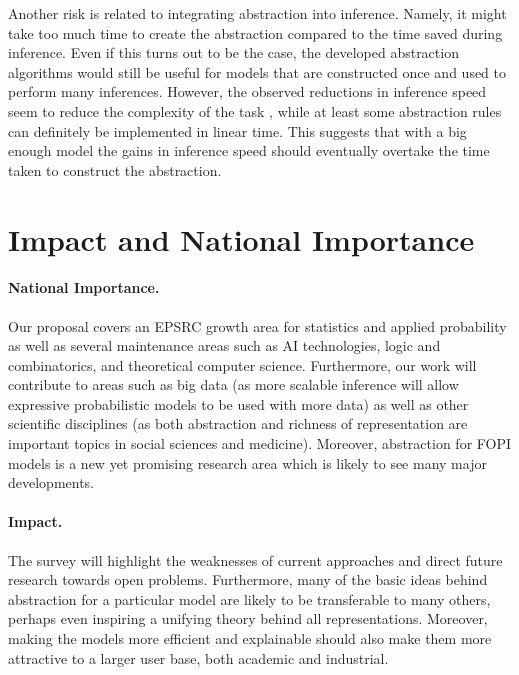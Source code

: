 \documentclass{article}
\begin{document}
Another risk is related to integrating abstraction into inference. Namely, it
might take too much time to create the abstraction compared to the time saved
during inference. Even if this turns out to be the case, the developed
abstraction algorithms would still be useful for models that are constructed
once and used to perform many inferences. However, the observed reductions in
inference speed seem to reduce the complexity of the task
\cite{DBLP:conf/icml/HoltzenBM18}, while at least some abstraction rules can
definitely be implemented in linear time. This suggests that with a big enough
model the gains in inference speed should eventually overtake the time taken to
construct the abstraction.

\section{Impact and National Importance} \label{sec:9}

\paragraph{National Importance.} Our proposal covers an EPSRC growth area for
statistics and applied probability as well as several maintenance areas such as
AI technologies, logic and combinatorics, and theoretical computer science.
Furthermore, our work will contribute to areas such as big data (as more
scalable inference will allow expressive probabilistic models to be used with
more data) as well as other scientific disciplines (as both abstraction and
richness of representation are important topics in social sciences and
medicine). Moreover, abstraction for FOPI models is a new yet promising research
area \cite{DBLP:conf/icml/HoltzenBM18} which is likely to see many major
developments.

\paragraph{Impact.} The survey will highlight the weaknesses of current
approaches and direct future research towards open problems. Furthermore, many
of the basic ideas behind abstraction for a particular model are likely to be
transferable to many others, perhaps even inspiring a unifying theory behind all
representations. Moreover, making the models more efficient and explainable
should also make them more attractive to a larger user base, both academic and
industrial.



\end{document}
